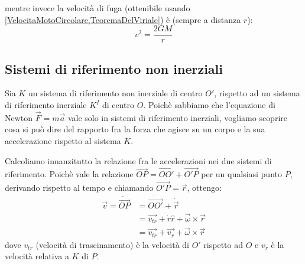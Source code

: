 \documentclass[../main.tex]{subfiles}
\begin{document}
mentre invece la velocità di fuga (ottenibile usando \cref{VelocitaMotoCircolare,TeoremaDelViriale}) è (sempre a distanza $r$):
\begin{equation} \label{VelocitaDiFuga}
	v^2=\frac{2GM}{r}
\end{equation}




\subsection{Sistemi di riferimento non inerziali}
Sia $K$ un sistema di riferimento non inerziale di centro $O'$, rispetto ad un sistema di riferimento
inerziale $K^I$ di centro $O$. Poichè sabbiamo che l'equazione di Newton $\overrightarrow{F}=m\overrightarrow{a}$
vale solo in sistemi di riferimento inerziali, vogliamo scoprire cosa si può dire del rapporto fra la forza
che agisce su un corpo e la sua accelerazione rispetto al sistema $K$.

Calcoliamo innanzitutto la relazione fra le accelerazioni nei due sistemi di riferimento. Poichè vale la
relazione $\overrightarrow{OP}=\overrightarrow{OO'}+\overrightarrow{O'P}$ per un qualsiasi punto $P$, derivando 
rispetto al tempo e chiamando $\overrightarrow{O'P}=\overrightarrow{r}$, ottengo:
\begin{equation}\label{VelNonInerziale}
\begin{split}
	\overrightarrow{v}=\dot{\overrightarrow{OP}}	& =\dot{\overrightarrow{OO'}}+\dot{\overrightarrow{r}}\\
													& =\overrightarrow{v_{tr}}+\dot{r}\hat{r}+\overrightarrow{\omega}\times\overrightarrow{r}\\
													& =\overrightarrow{v_{tr}}+\overrightarrow{v_r}+\overrightarrow{\omega}\times\overrightarrow{r}
\end{split}
\end{equation}
dove $v_{tr}$ (velocità di trascinamento) è la velocità di $O'$ rispetto ad $O$ e $v_r$ è la velocità relativa
a $K$ di $P$.
\end{document}
